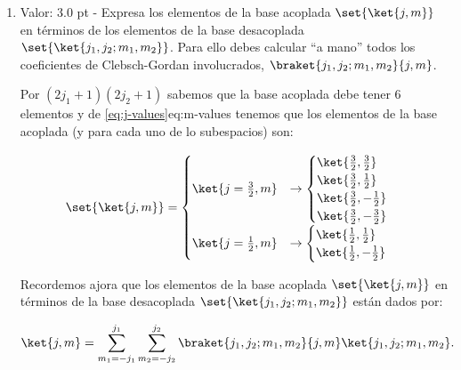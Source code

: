 \documentclass[./../main.tex]{subfiles}
\begin{document}
\begin{exercise}
\begin{enumerate}[label=(\alph*)]
            \pagebreak
            \item Valor: 3.0 pt - Expresa los elementos de la base acoplada \(\set{\ket{j,m}}\) en términos de los elementos de la base desacoplada \(\set{\ket{j_{1}, j_{2}; m_{1}, m_{2}}}\). Para ello debes calcular ``a mano'' todos los coeficientes de Clebsch-Gordan involucrados, \(\braket{j_{1},j_{2}; m_{1}, m_{2}}{j,m}\).
            
            \begin{solution}
                Por \((2j_{1} + 1)(2j_{2} + 1)\) sabemos que la base acoplada debe tener 6 elementos y de \cref{eq:j-values}{eq:m-values} tenemos que los elementos de la base acoplada (y para cada uno de lo subespacios) son:

                \begin{equation*}
                    \set{\ket{j,m}} = 
                    \begin{cases}
                        \ket{j = \frac{3}{2}, m} &\rightarrow \begin{cases}
                            \ket{\frac{3}{2}, \frac{3}{2}}\\
                            \ket{\frac{3}{2}, \frac{1}{2}}\\
                            \ket{\frac{3}{2}, -\frac{1}{2}}\\
                            \ket{\frac{3}{2}, -\frac{3}{2}}
                        \end{cases}\\
                        \ket{j = \frac{1}{2}, m} &\rightarrow \begin{cases}
                            \ket{\frac{1}{2}, \frac{1}{2}}\\
                            \ket{\frac{1}{2}, -\frac{1}{2}}
                        \end{cases}
                    \end{cases}
                \end{equation*}

                Recordemos ajora que los elementos de la base acoplada \(\set{\ket{j,m}}\) en términos de la base desacoplada \(\set{\ket{j_{1}, j_{2}; m_{1}, m_{2}}}\) están dados por:

                \begin{equation}
                    \ket{j, m} = \sum_{m_{1} = -j_{1}}^{j_{1}}\sum_{m_{2} = -j_{2}}^{j_{2}}\braket{j_{1}, j_{2}; m_{1}, m_{2}}{j, m}\ket{j_{1}, j_{2}; m_{1}, m_{2}}.
                    \label{eq:coupled-base-elements}
                \end{equation}


\end{solution}
\end{enumerate}
\end{exercise}
\end{document}
